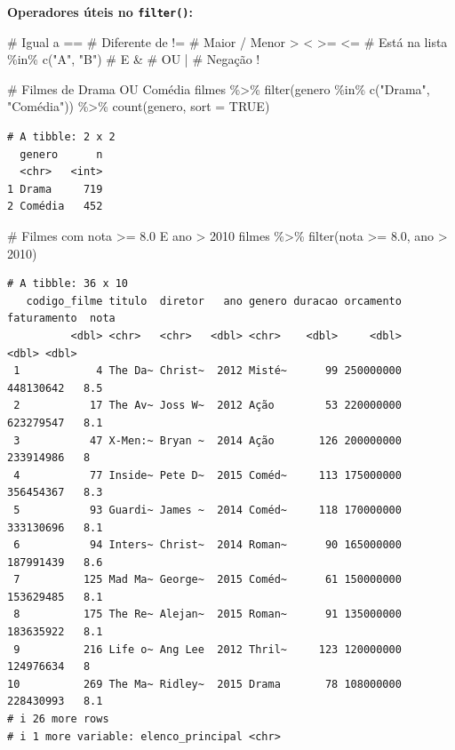 \documentclass[
  letterpaper,
]{scrbook}
\newenvironment{Shaded}{\begin{snugshade}}{\end{snugshade}}
\newcommand{\AttributeTok}[1]{\textcolor[rgb]{0.40,0.45,0.13}{#1}}
\newcommand{\CommentTok}[1]{\textcolor[rgb]{0.37,0.37,0.37}{#1}}
\newcommand{\ConstantTok}[1]{\textcolor[rgb]{0.56,0.35,0.01}{#1}}
\newcommand{\DecValTok}[1]{\textcolor[rgb]{0.68,0.00,0.00}{#1}}
\newcommand{\FloatTok}[1]{\textcolor[rgb]{0.68,0.00,0.00}{#1}}
\newcommand{\FunctionTok}[1]{\textcolor[rgb]{0.28,0.35,0.67}{#1}}
\newcommand{\NormalTok}[1]{\textcolor[rgb]{0.00,0.23,0.31}{#1}}
\newcommand{\SpecialCharTok}[1]{\textcolor[rgb]{0.37,0.37,0.37}{#1}}
\newcommand{\StringTok}[1]{\textcolor[rgb]{0.13,0.47,0.30}{#1}}
\begin{document}
\textbf{Operadores úteis no \texttt{filter()}:}

\begin{Shaded}
\begin{Highlighting}[]
\CommentTok{\# Igual a          ==}
\CommentTok{\# Diferente de     !=}
\CommentTok{\# Maior / Menor    \textgreater{}   \textless{}   \textgreater{}=   \textless{}=}
\CommentTok{\# Está na lista    \%in\% c("A", "B")}
\CommentTok{\# E                \&}
\CommentTok{\# OU               |}
\CommentTok{\# Negação          !}
\end{Highlighting}
\end{Shaded}

\begin{Shaded}
\begin{Highlighting}[]
\CommentTok{\# Filmes de Drama OU Comédia}
\NormalTok{filmes }\SpecialCharTok{\%\textgreater{}\%} 
  \FunctionTok{filter}\NormalTok{(genero }\SpecialCharTok{\%in\%} \FunctionTok{c}\NormalTok{(}\StringTok{"Drama"}\NormalTok{, }\StringTok{"Comédia"}\NormalTok{)) }\SpecialCharTok{\%\textgreater{}\%} 
  \FunctionTok{count}\NormalTok{(genero, }\AttributeTok{sort =} \ConstantTok{TRUE}\NormalTok{)}
\end{Highlighting}
\end{Shaded}

\begin{verbatim}
# A tibble: 2 x 2
  genero      n
  <chr>   <int>
1 Drama     719
2 Comédia   452
\end{verbatim}

\begin{Shaded}
\begin{Highlighting}[]
\CommentTok{\# Filmes com nota \textgreater{}= 8.0 E ano \textgreater{} 2010}
\NormalTok{filmes }\SpecialCharTok{\%\textgreater{}\%} 
  \FunctionTok{filter}\NormalTok{(nota }\SpecialCharTok{\textgreater{}=} \FloatTok{8.0}\NormalTok{, ano }\SpecialCharTok{\textgreater{}} \DecValTok{2010}\NormalTok{)}
\end{Highlighting}
\end{Shaded}

\begin{verbatim}
# A tibble: 36 x 10
   codigo_filme titulo  diretor   ano genero duracao orcamento faturamento  nota
          <dbl> <chr>   <chr>   <dbl> <chr>    <dbl>     <dbl>       <dbl> <dbl>
 1            4 The Da~ Christ~  2012 Misté~      99 250000000   448130642   8.5
 2           17 The Av~ Joss W~  2012 Ação        53 220000000   623279547   8.1
 3           47 X-Men:~ Bryan ~  2014 Ação       126 200000000   233914986   8  
 4           77 Inside~ Pete D~  2015 Coméd~     113 175000000   356454367   8.3
 5           93 Guardi~ James ~  2014 Coméd~     118 170000000   333130696   8.1
 6           94 Inters~ Christ~  2014 Roman~      90 165000000   187991439   8.6
 7          125 Mad Ma~ George~  2015 Coméd~      61 150000000   153629485   8.1
 8          175 The Re~ Alejan~  2015 Roman~      91 135000000   183635922   8.1
 9          216 Life o~ Ang Lee  2012 Thril~     123 120000000   124976634   8  
10          269 The Ma~ Ridley~  2015 Drama       78 108000000   228430993   8.1
# i 26 more rows
# i 1 more variable: elenco_principal <chr>
\end{verbatim}
\end{document}
